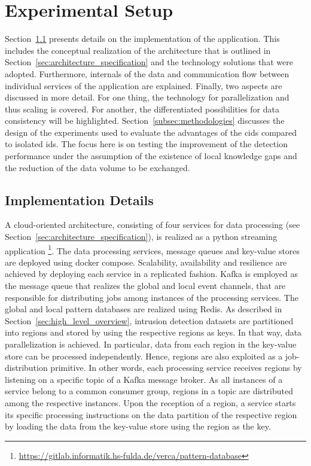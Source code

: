\documentclass[../../main.tex]{subfiles}
\begin{document}
\section{Experimental Setup}\label{sec:experimental_setup}

Section~\ref{subsec:implementation_details} presents details on the implementation of the application. This includes the conceptual realization of the architecture that is outlined in Section~\ref{sec:architecture_specification} and the technology solutions that were adopted.  Furthermore, internals of the data and communication flow between individual services of the application are explained. Finally, two aspects are discussed in more detail. For one thing, the technology for parallelization and thus scaling is covered. For another, the differentiated possibilities for data consistency will be highlighted. Section~\ref{subsec:methodologies} discusses the design of the experiments used to evaluate the advantages of the \gls{cids} compared to isolated \gls{ids}. The focus here is on testing the improvement of the detection performance under the assumption of the existence of local knowledge gaps and the reduction of the data volume to be exchanged.

\subsection{Implementation Details}\label{subsec:implementation_details}

A cloud-oriented architecture, consisting of four services for data processing (see Section~\ref{sec:architecture_specification}), is realized as a python streaming application \footnote{\url{https://gitlab.informatik.hs-fulda.de/verca/pattern-database}}. The data processing services, message queues and key-value stores are deployed using docker compose. Scalability, availability and resilience are achieved by deploying each service in a replicated fashion. Kafka is employed as the message queue that realizes the global and local event channels, that are responsible for distributing jobs among instances of the processing services. The global and local pattern databases are realized using Redis. As described in Section~\ref{sec:high_level_overview}, intrusion detection datasets are partitioned into regions and stored by using the respective regions as keys. In that way, data parallelization is achieved. In particular, data from each region in the key-value store can be processed independently. Hence, regions are also exploited as a job-distribution primitive. In other words, each processing service receives regions by listening on a specific topic of a Kafka message broker. As all instances of a service belong to a common consumer group, regions in a topic are distributed among the respective instances. Upon the reception of a region, a service starts its specific processing instructions on the data partition of the respective region by loading the data from the key-value store using the region as the key.
\end{document}
